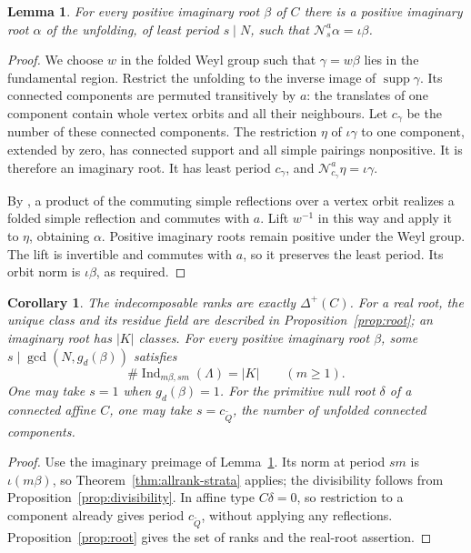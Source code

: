 \documentclass[11pt, reqno]{amsart}
\numberwithin{equation}{section}
\newtheorem{lemma}[theorem]{Lemma}
\newtheorem{corollary}[theorem]{Corollary}
\theoremstyle{definition}
\theoremstyle{remark}
\newcommand{\op}[1]{\operatorname{#1}}
\newcommand{\mc}[1]{\mathcal{#1}}
\newcommand{\Ind}{\op{Ind}}
\newcommand{\supp}{\op{supp}}
\newcommand{\Qbar}{\widetilde Q}
\newcommand{\unfoldcomp}{{c_{\Qbar}}}
\begin{document}
\begin{lemma}\label{lem:imaginary-preimage}
For every positive imaginary root $\beta$ of $C$ there is a positive
imaginary root $\alpha$ of the unfolding, of least period $s\mid N$,
such that $\mc N_s^a\alpha=\iota\beta$.
\end{lemma}
\begin{proof}
We choose $w$ in the folded Weyl group such that $\gamma=w\beta$ lies
in the fundamental region. Restrict the unfolding to the inverse
image of $\supp\gamma$. Its connected components are permuted
transitively by $a$: the translates of one component contain whole
vertex orbits and all their neighbours. Let $c_\gamma$ be the number of these connected components.
The restriction $\eta$ of $\iota\gamma$ to one component, extended
by zero, has connected support and all simple pairings nonpositive.
It is therefore an imaginary root. It has least period $c_\gamma$, and
$\mc N_{c_\gamma}^a\eta=\iota\gamma$.

By \cite[Lemma~3]{Hubery}, a product of the commuting simple
reflections over a vertex orbit realizes a folded simple reflection
and commutes with $a$.
Lift $w^{-1}$ in this way and apply it to $\eta$, obtaining $\alpha$.
Positive imaginary roots remain positive under the Weyl group.
The lift is invertible and commutes with $a$, so it preserves the
least period. Its orbit norm is $\iota\beta$, as required.
\end{proof}

\begin{corollary}\label{cor:full-kac}
The indecomposable ranks are exactly $\Delta^+(C)$. For a real root,
the unique class and its residue field are described in
Proposition~\ref{prop:root}; an imaginary root has $|K|$ classes. For every positive imaginary root $\beta$, some
$s\mid\gcd(N,g_d(\beta))$ satisfies
\[ \#\Ind_{m\beta,sm}(\Lambda)=|K|\qquad(m\ge1). \]
One may take $s=1$ when $g_d(\beta)=1$. For the primitive null root
$\delta$ of a connected affine $C$, one may take $s=\unfoldcomp$, the number
of unfolded connected components.
\end{corollary}
\begin{proof}
Use the imaginary preimage of Lemma~\ref{lem:imaginary-preimage}.
Its norm at period $sm$ is $\iota(m\beta)$, so
Theorem~\ref{thm:allrank-strata} applies; the divisibility follows
from Proposition~\ref{prop:divisibility}. In affine type $C\delta=0$,
so restriction to a component already gives period $\unfoldcomp$, without
applying any reflections. Proposition~\ref{prop:root} gives the set
of ranks and the real-root assertion.
\end{proof}
\end{document}
